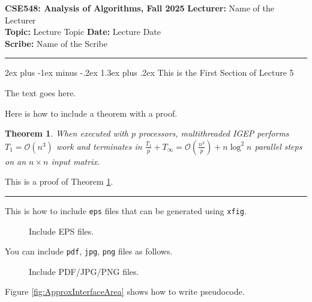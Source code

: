 \documentclass[11pt]{article}
\makeatletter
\renewcommand{\section}{\@startsection{section}{1}{0mm}%
                                   {2ex plus -1ex minus -.2ex}%
                                   {1.3ex plus .2ex}%
                                   {\normalfont\Large\bfseries}}%
\newenvironment{proof}{{\bf Proof:  }}{\hfill\rule{2mm}{2mm}}
\newtheorem{theorem}[fact]{Theorem}
\newcommand{\Oh}[1]{{\mathcal O}\left({#1}\right)}
\newcommand\figcaption{\def\@captype{figure}\caption}
\newcommand{\headings}[4]{
{\bf CSE548: Analysis of Algorithms, Fall 2025} \hfill {{\bf Lecturer:} #1}\\
{{\bf Topic:} #2} \hfill {{\bf Date:} #3} \\
{{\bf Scribe:} #4}\\
\rule[0.1in]{\textwidth}{0.025in}
}
\makeatother
\begin{document}
\headings{Name of the Lecturer}{Lecture Topic}{Lecture Date}{Name of the Scribe}
\newcommand{\lecnum}{5}  %

\section{This is the First Section of Lecture \lecnum}

The text goes here.

Here is how to include a theorem with a proof.

\begin{theorem}
 When executed with $p$ processors,
 multithreaded IGEP performs $T_{1} = \Oh{n^3}$ work and terminates
 in ${\frac{T_{1}}{p}} + T_{\infty} = \Oh{\frac{n^3}{p}} + n\log^{2}{n}$
 parallel steps on an $n \times n$ input matrix.
\label{thm:igep}
\end{theorem}

\begin{proof}
This is a proof of Theorem \ref{thm:igep}.
\end{proof}


This is how to include {\tt eps} files that can be generated using {\tt xfig}.

\begin{figure}[h]
\begin{center}
\figcaption{Include EPS files.} 
\end{center}
\end{figure}


You can include {\tt{pdf}}, {\tt{jpg}}, {\tt{png}} files as follows.

\begin{figure}[h!]
\centering
\figcaption{Include PDF/JPG/PNG files.} 
\label{fig:example-figure}
\end{figure}


Figure \ref{fig:ApproxInterfaceArea} shows how to write pseudocode.
\end{document}
